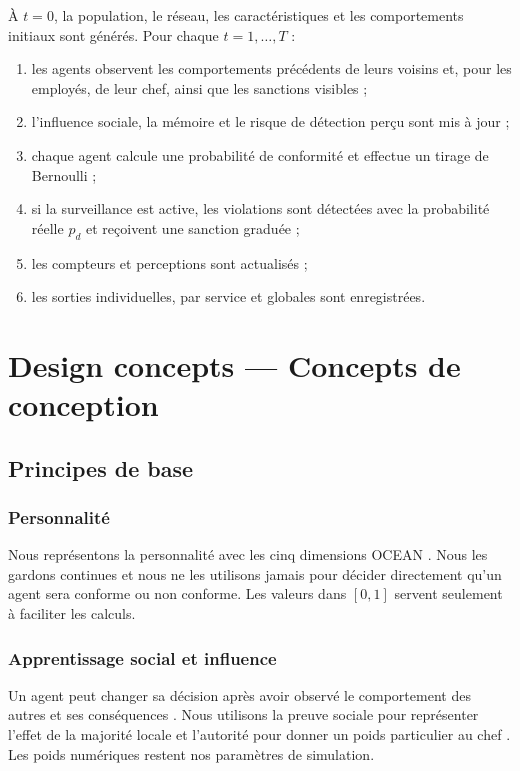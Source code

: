 \documentclass[11pt,a4paper]{article}
\begin{document}
À $t=0$, la population, le réseau, les caractéristiques et les comportements
initiaux sont générés. Pour chaque $t=1,\ldots,T$ :

\begin{enumerate}
  \item les agents observent les comportements précédents de leurs voisins et,
  pour les employés, de leur chef, ainsi que les sanctions visibles ;
  \item l’influence sociale, la mémoire et le risque de détection perçu sont
  mis à jour ;
  \item chaque agent calcule une probabilité de conformité et effectue un tirage
  de Bernoulli ;
  \item si la surveillance est active, les violations sont détectées avec la
  probabilité réelle $p_d$ et reçoivent une sanction graduée ;
  \item les compteurs et perceptions sont actualisés ;
  \item les sorties individuelles, par service et globales sont enregistrées.
\end{enumerate}

\section{Design concepts — Concepts de conception}

\subsection{Principes de base}

\subsubsection{Personnalité}

Nous représentons la personnalité avec les cinq dimensions OCEAN
\cite{costa1992}. Nous les gardons continues et nous ne les utilisons jamais
pour décider directement qu’un agent sera conforme ou non conforme. Les valeurs
dans $[0,1]$ servent seulement à faciliter les calculs.

\subsubsection{Apprentissage social et influence}

Un agent peut changer sa décision après avoir observé le comportement des autres
et ses conséquences \cite{bandura1977}. Nous utilisons la preuve sociale pour
représenter l’effet de la majorité locale et l’autorité pour donner un poids
particulier au chef \cite{cialdini2009}. Les poids numériques restent nos
paramètres de simulation.
\end{document}
